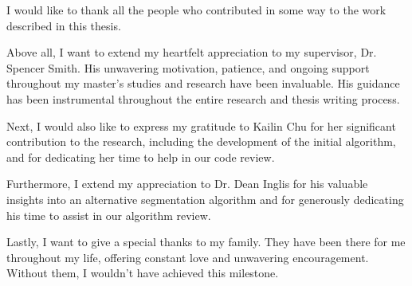 
I would like to thank all the people who contributed in some way to the work described in this thesis.

Above all, I want to extend my heartfelt appreciation to my supervisor, Dr. Spencer Smith. His unwavering motivation, patience, and ongoing support throughout my master's studies and research have been invaluable. His guidance has been instrumental throughout the entire research and thesis writing process.

Next, I would also like to express my gratitude to Kailin Chu for her significant contribution to the research, including the development of the initial algorithm, and for dedicating her time to help in our code review.

Furthermore, I extend my appreciation to Dr. Dean Inglis for his valuable insights into an alternative segmentation algorithm and for generously dedicating his time to assist in our algorithm review.

Lastly, I want to give a special thanks to my family. They have been there for me throughout my life, offering constant love and unwavering encouragement. Without them, I wouldn't have achieved this milestone.